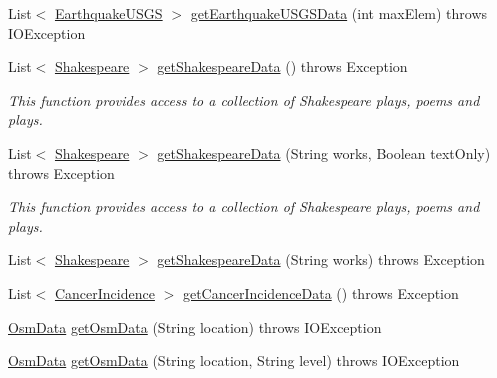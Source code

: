 \begin{DoxyCompactItemize}
\item 
List$<$ \hyperlink{classbridges_1_1data__src__dependent_1_1_earthquake_u_s_g_s}{Earthquake\+U\+S\+GS} $>$ \hyperlink{classbridges_1_1connect_1_1_data_source_af49a5212ae2bb6eed4501152276b79ad}{get\+Earthquake\+U\+S\+G\+S\+Data} (int max\+Elem)  throws I\+O\+Exception 
\item 
List$<$ \hyperlink{classbridges_1_1data__src__dependent_1_1_shakespeare}{Shakespeare} $>$ \hyperlink{classbridges_1_1connect_1_1_data_source_af2b6e5df074d0a689e8a992b1bea6f3e}{get\+Shakespeare\+Data} ()  throws Exception 
\begin{DoxyCompactList}\small\item\em This function provides access to a collection of Shakespeare plays, poems and plays. \end{DoxyCompactList}\item 
List$<$ \hyperlink{classbridges_1_1data__src__dependent_1_1_shakespeare}{Shakespeare} $>$ \hyperlink{classbridges_1_1connect_1_1_data_source_abf8e8f8ff3eb14fa6c6b5ce6b48dbadb}{get\+Shakespeare\+Data} (String works, Boolean text\+Only)  throws Exception 
\begin{DoxyCompactList}\small\item\em This function provides access to a collection of Shakespeare plays, poems and plays. \end{DoxyCompactList}\item 
List$<$ \hyperlink{classbridges_1_1data__src__dependent_1_1_shakespeare}{Shakespeare} $>$ \hyperlink{classbridges_1_1connect_1_1_data_source_a04aa757c45139e52525d4b09156abfe1}{get\+Shakespeare\+Data} (String works)  throws Exception 
\item 
List$<$ \hyperlink{classbridges_1_1data__src__dependent_1_1_cancer_incidence}{Cancer\+Incidence} $>$ \hyperlink{classbridges_1_1connect_1_1_data_source_a7617a81fe00361c3ae6fed5873739aa2}{get\+Cancer\+Incidence\+Data} ()  throws Exception 
\item 
\hyperlink{classbridges_1_1data__src__dependent_1_1_osm_data}{Osm\+Data} \hyperlink{classbridges_1_1connect_1_1_data_source_a592a35a9f3285fd1d6e76932bd982eeb}{get\+Osm\+Data} (String location)  throws I\+O\+Exception 
\item 
\hyperlink{classbridges_1_1data__src__dependent_1_1_osm_data}{Osm\+Data} \hyperlink{classbridges_1_1connect_1_1_data_source_a2a1b73656312799046cd7bbf8bdebb0e}{get\+Osm\+Data} (String location, String level)  throws I\+O\+Exception 
\item 

\end{DoxyCompactItemize}
